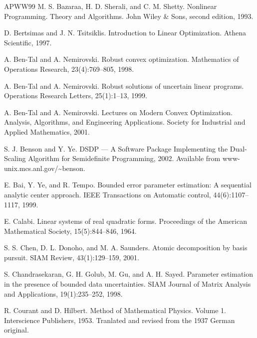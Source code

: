 \begin{thebibliography}{APWW99}
 M. S. Bazaraa, H. D. Sherali, and C. M. Shetty. Nonlinear Programming. Theory and Algorithms. John Wiley \& Sons, second edition, 1993.

 D. Bertsimas and J. N. Tsitsiklis. Introduction to Linear Optimization. Athena Scientific, 1997.

 A. Ben-Tal and A. Nemirovski. Robust convex optimization. Mathematics of Operations Research, 23(4):769–805, 1998.

 A. Ben-Tal and A. Nemirovski. Robust solutions of uncertain linear programs. Operations Research Letters, 25(1):1–13, 1999.

 A. Ben-Tal and A. Nemirovski. Lectures on Modern Convex Optimization. Analysis, Algorithms, and Engineering Applications. Society for Industrial and Applied Mathematics, 2001.

 S. J. Benson and Y. Ye. DSDP — A Software Package Implementing the Dual-Scaling Algorithm for Semidefinite Programming, 2002. Available from www-unix.mcs.anl.gov/\textasciitilde{}benson.

 E. Bai, Y. Ye, and R. Tempo. Bounded error parameter estimation: A sequential analytic center approach. IEEE Transactions on Automatic control, 44(6):1107–1117, 1999.

 E. Calabi. Linear systems of real quadratic forms. Proceedings of the American Mathematical Society, 15(5):844–846, 1964.

 S. S. Chen, D. L. Donoho, and M. A. Saunders. Atomic decomposition by basis pursuit. SIAM Review, 43(1):129–159, 2001.

 S. Chandrasekaran, G. H. Golub, M. Gu, and A. H. Sayed. Parameter estimation in the presence of bounded data uncertainties. SIAM Journal of Matrix Analysis and Applications, 19(1):235–252, 1998.

 R. Courant and D. Hilbert. Method of Mathematical Physics. Volume 1. Interscience Publishers, 1953. Tranlated and revised from the 1937 German original.


\end{thebibliography}

